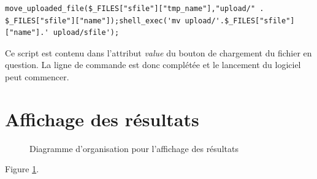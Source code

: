 \begin{DDbox}{\linewidth}
\begin{lstlisting}
move_uploaded_file($_FILES["sfile"]["tmp_name"],"upload/" . $_FILES["sfile"]["name"]);shell_exec('mv upload/'.$_FILES["sfile"]["name"].' upload/sfile');
\end{lstlisting}
\end{DDbox}

Ce script est contenu dans l'attribut \textit{value} du bouton de chargement du fichier en question. La ligne de commande est donc complétée et le lancement du logiciel peut commencer. 

\section{Affichage des résultats}

\begin{figure}[!ht]
	\begin{center}
		\caption{Diagramme d'organisation pour l'affichage des résultats}
  		\label{DiagResults}
  	\end{center}	
\end{figure}

Figure \ref{DiagResults}. 

